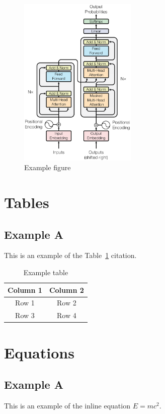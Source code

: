 \documentclass{scnuthesis}
\begin{document}
    \begin{figure}[htbp]
        \centering
        \includegraphics[width=0.5\textwidth]{fig/transformer.eps}
        \caption{Example figure}
        \label{fig:example-figure}
    \end{figure}

    \section{Tables}
    \subsection{Example A}
    This is an example of the Table~\ref{tab:example-table} citation.
    \begin{table}[htbp]
        \centering
        \caption{Example table}
        \label{tab:example-table}
        \begin{tabular}{|c|c|}
            \toprule Column 1 & Column 2 \\
            \midrule Row 1    & Row 2    \\
            Row 3             & Row 4    \\
            \bottomrule
        \end{tabular}
    \end{table}

    \section{Equations}
    \subsection{Example A}
    This is an example of the inline equation $E=mc^{2}$.
\end{document}
